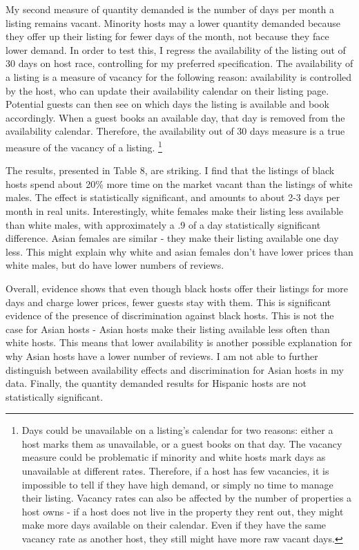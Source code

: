 
My second measure of quantity demanded is the number of days per month a listing remains vacant. Minority hosts may a lower quantity demanded because they offer up their listing for fewer days of the month, not because they face lower demand. In order to test this, I regress the availability of the listing out of 30 days on host race, controlling for my preferred specification. The availability of a listing is a measure of vacancy for the following reason: availability is controlled by the host, who can update their availability calendar on their listing page. Potential guests can then see on which days the listing is available and book accordingly. When a guest books an available day, that day is removed from the availability calendar. Therefore, the availability out of 30 days measure is a true measure of the vacancy of a listing.%
	\footnote{Days could be unavailable on a listing's calendar for two reasons: either a host marks them as unavailable, or a guest books on that day. The vacancy measure could be problematic if minority and white hosts mark days as unavailable at different rates. Therefore, if a host has few vacancies, it is impossible to tell if they have high demand, or simply no time to manage their listing. Vacancy rates can also be affected by the number of properties a host owns - if a host does not live in the property they rent out, they might make more days available on their calendar. Even if they have the same vacancy rate as another host, they still might have more raw vacant days.}

The results, presented in Table 8, are striking. I find that the listings of black hosts spend about 20\% more time on the market vacant than the listings of white males. The effect is statistically significant, and amounts to about 2-3 days per month in real units. Interestingly, white females make their listing less available than white males, with approximately a .9 of a day statistically significant difference. Asian females are similar - they make their listing available one day less. This might explain why white and asian females don't have lower prices than white males, but do have lower numbers of reviews.

Overall, evidence shows that even though black hosts offer their listings for more days and charge lower prices, fewer guests stay with them. This is significant evidence of the presence of discrimination against black hosts. This is not the case for Asian hosts - Asian hosts make their listing available less often than white hosts. This means that lower availability is another possible explanation for why Asian hosts have a lower number of reviews. I am not able to further distinguish between availability effects and discrimination for Asian hosts in my data. Finally, the quantity demanded results for Hispanic hosts are not statistically significant. 


